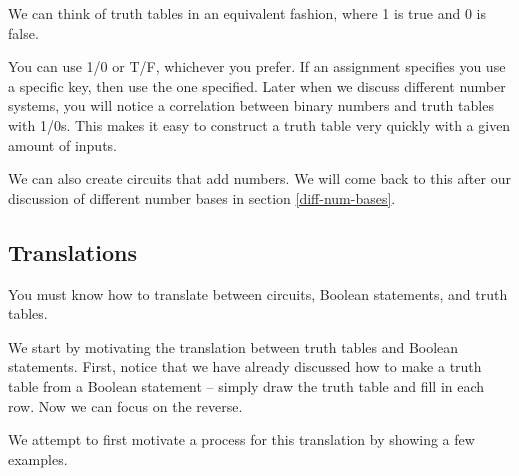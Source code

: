 \documentclass[main.tex]{subfiles}
\begin{document}
We can think of truth tables in an equivalent fashion, where 1 is true and 0 is false.


You can use 1/0 or T/F, whichever you prefer. If an assignment specifies you use a specific key, then use the one specified. Later when we discuss different number systems, you will notice a correlation between binary numbers and truth tables with 1/0s. This makes it easy to construct a truth table very quickly with a given amount of inputs.

We can also create circuits that add numbers. We will come back to this after our discussion of different number bases in section \ref{diff-num-bases}.

\subsection{Translations}

You must know how to translate between circuits, Boolean statements, and truth tables.

We start by motivating the translation between truth tables and Boolean statements. First, notice that we have already discussed how to make a truth table from a Boolean statement -- simply draw the truth table and fill in each row. Now we can focus on the reverse.

We attempt to first motivate a process for this translation by showing a few examples.
\end{document}
